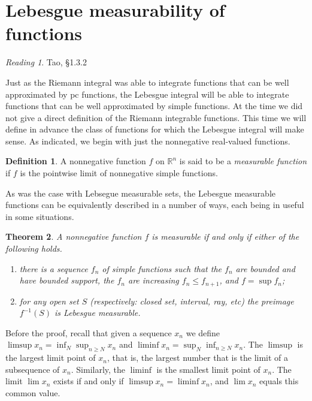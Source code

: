 \documentclass[10pt,oneside]{amsbook}
\newcommand{\RR}{{\mathbb R}}
\theoremstyle{definition}
\theoremstyle{plain}
\newtheorem{thm}{Theorem}[section]
\theoremstyle{definition}
\newtheorem{defn}[thm]{Definition}
\theoremstyle{remark}
\newtheorem*{reading}{Reading}
\numberwithin{equation}{section}
\numberwithin{figure}{section}
\begin{document}
\newpage
\section{Lebesgue measurability of functions}

\begin{reading}
  Tao, \S 1.3.2
\end{reading}

Just as the Riemann integral was able to integrate functions that can be well approximated by pc functions, the Lebesgue integral will be able to integrate functions that can be well approximated by simple functions. At the time we did not give a direct definition of the Riemann integrable functions. This time we will define in advance the class of functions for which the Lebesgue integral will make sense. As indicated, we begin with just the nonnegative real-valued functions.

\begin{defn}
  A nonnegative function $f$ on $\RR^n$ is said to be a \emph{measurable function} if $f$ is the pointwise limit of nonnegative simple functions.
\end{defn}

As was the case with Lebsegue measurable sets, the Lebesgue measurable functions can be equivalently described in a number of ways, each being in useful in some situations.

\begin{thm}
  \label{thm:measurable-equiv}
  A nonnegative function $f$ is measurable if and only if either of the following holds.
  \begin{enumerate}
  \item there is a sequence $f_n$ of simple functions such that the $f_n$ are bounded and have bounded support, the $f_n$ are increasing $f_n\leq f_{n+1}$, and $f=\sup f_n$;
  \item for any open set $S$ (respectively: closed set, interval, ray, etc) the preimage $f^{-1}(S)$ is Lebesgue measurable.
  \end{enumerate}
\end{thm}

Before the proof, recall that given a sequence $x_n$ we define $\limsup x_n=\inf_N\sup_{n\geq N}x_n$ and $\liminf x_n=\sup_N\inf_{n\geq N}x_n$. The $\limsup$ is the largest limit point of $x_n$, that is, the largest number that is the limit of a subsequence of $x_n$. Similarly, the $\liminf$ is the smallest limit point of $x_n$. The limit $\lim x_n$ exists if and only if $\limsup x_n=\liminf x_n$, and $\lim x_n$ equals this common value.
\end{document}
